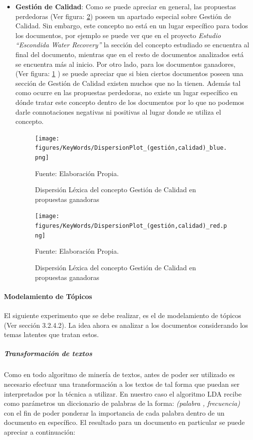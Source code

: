 \begin{itemize}
        \item \textbf{Gestión de Calidad}: Como se puede apreciar en general, las propuestas perdedoras (Ver figura: \ref{fig:GC_Loss}) poseen un apartado especial sobre Gestión de Calidad. Sin embargo, este concepto no está en un lugar específico para todos los documentos, por ejemplo se puede ver que en el proyecto \textit{Estudio ``Escondida Water Recovery''} la sección del concepto estudiado se encuentra al final del documento, mientras que en el resto de documentos analizados está se encuentra más al inicio. Por otro lado, para los documentos ganadores, (Ver figura: \ref{fig:GC_Win} ) se puede apreciar que si bien ciertos documentos poseen una sección de Gestión de Calidad existen muchos que no la tienen. Además tal como ocurre en las propuestas perdedoras, no existe un lugar específico en dónde tratar este concepto dentro de los documentos por lo que no podemos darle connotaciones negativas ni positivas al lugar donde se utiliza el concepto.
        
        \begin{figure}[H]
        \centering
        \texttt{[image: figures/KeyWords/DispersionPlot\_(gestión,calidad)\_blue.png]}
        \caption{\label{fig:GC_Win} Dispersión Léxica del concepto Gestión de Calidad en propuestas ganadoras} Fuente: Elaboración Propia.
        \end{figure}
        
        \begin{figure}[H]
        \centering
        \texttt{[image: figures/KeyWords/DispersionPlot\_(gestión,calidad)\_red.png]}
        \caption{\label{fig:GC_Loss} Dispersión Léxica del concepto Gestión de Calidad en propuestas ganadoras} Fuente: Elaboración Propia.
        \end{figure}
    \end{itemize}

    \paragraph{Modelamiento de Tópicos}
    \paragraph*{}
    El siguiente experimento que se debe realizar, es el de modelamiento de tópicos (Ver sección 3.2.4.2). La idea ahora es analizar a los documentos considerando los temas latentes que tratan estos.  
    
    \subparagraph{Transformación de textos}
    \subparagraph*{}
    Como en todo algoritmo de minería de textos, antes de poder ser utilizado es necesario efectuar una transformación a los textos de tal forma que puedan ser interpretados por la técnica a utilizar. En nuestro caso el algoritmo LDA recibe como parámetros un diccionario de palabras de la forma: \textit{(palabra , frecuencia)} con el fin de poder ponderar la importancia de cada palabra dentro de un documento en específico. El resultado para un documento en particular se puede apreciar a continuación:
    
